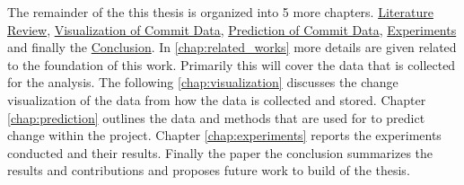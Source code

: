 The remainder of the this thesis is organized into 5 more chapters. \hyperref[chap:related_works]{Literature Review}, \hyperref[chap:visualization]{Visualization of Commit Data}, \hyperref[chap:prediction]{Prediction of Commit Data}, \hyperref[chap:experiments]{Experiments} and finally the \hyperref[chap:conclusions]{Conclusion}. In \autoref{chap:related_works} more details are given related to the foundation of this work. Primarily this will cover the data that is collected for the analysis. The following \autoref{chap:visualization} discusses the change visualization of the data from how the data is collected and stored. Chapter \autoref{chap:prediction} outlines the data and methods that are used for to predict change within the project. Chapter \ref{chap:experiments} reports the experiments conducted and their results. Finally the paper the conclusion summarizes the results and contributions and proposes future work to build of the thesis.